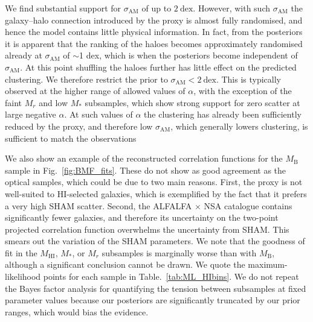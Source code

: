 \documentclass[usenatbib,useAMS]{mnras}
\newcommand{\HI}{\ensuremath{\mathrm{H}\scriptstyle\mathrm{I}}}
\newcommand{\scatter}{\ensuremath{\sigma_{\mathrm{AM}}}}
\newcommand{\matched}{ALFALFA $\times$ NSA }
\begin{document}
We find substantial support for $\scatter$ of up to $2~\mathrm{dex}$. However, with such $\scatter$ the galaxy--halo connection introduced by the proxy is almost fully randomised, and hence the model contains little physical information. In fact, from the posteriors it is apparent that the ranking of the haloes becomes approximately randomised already at $\scatter$ of $\sim$1 dex, which is when the posteriors become independent of $\scatter$. At this point shuffling the haloes further has little effect on the predicted clustering. We therefore restrict the prior to $\scatter < 2~\mathrm{dex}$. This is typically observed at the higher range of allowed values of $\alpha$, with the exception of the faint $M_r$ and low $M_*$ subsamples, which show strong support for zero scatter at large negative $\alpha$. At such values of $\alpha$ the clustering has already been sufficiently reduced by the proxy, and therefore low $\scatter$, which generally lowers clustering, is sufficient to match the observations


We also show an example of the reconstructed correlation functions for the $M_\mathrm{B}$ sample in Fig.~\ref{fig:BMF_fits}. These do not show as good agreement as the optical samples, which could be due to two main reasons. First, the proxy is not well-suited to $\HI$-selected galaxies, which is exemplified by the fact that it prefers a very high \ac{SHAM} scatter. Second, the \matched catalogue contains significantly fewer galaxies, and therefore its uncertainty on the two-point projected correlation function overwhelms the uncertainty from \ac{SHAM}. This smears out the variation of the \ac{SHAM} parameters. We note that the goodness of fit in the $M_{\HI}$, $M_*$, or $M_r$ subsamples is marginally worse than with $M_\mathrm{B}$, although a significant conclusion cannot be drawn. We quote the maximum-likelihood points for each sample in Table.~\ref{tab:ML_HIbins}. We do not repeat the Bayes factor analysis for quantifying the tension between subsamples at fixed parameter values because our posteriors are significantly truncated by our prior ranges, which would bias the evidence.
\end{document}
